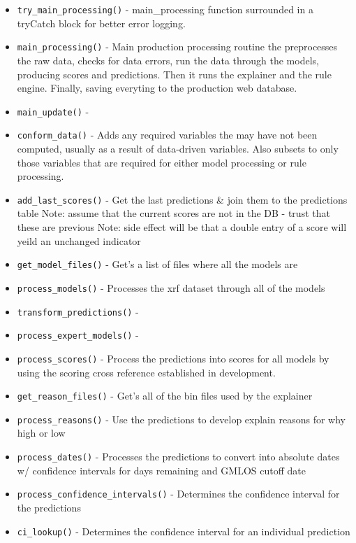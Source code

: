 \documentclass[
]{book}
\providecommand{\tightlist}{%
  \setlength{\itemsep}{0pt}\setlength{\parskip}{0pt}}
\begin{document}
\begin{itemize}
\tightlist
\item
  \texttt{try\_main\_processing()} - main\_processing function surrounded in a tryCatch block for better error logging.
\item
  \texttt{main\_processing()} - Main production processing routine the preprocesses the raw data, checks for data errors, run the data through the models, producing scores and predictions. Then it runs the explainer and the rule engine. Finally, saving everyting to the production web database.
\item
  \texttt{main\_update()} -
\item
  \texttt{conform\_data()} - Adds any required variables the may have not been computed, usually as a result of data-driven variables. Also subsets to only those variables that are required for either model processing or rule processing.
\item
  \texttt{add\_last\_scores()} - Get the last predictions \& join them to the predictions table Note: assume that the current scores are not in the DB - trust that these are previous Note: side effect will be that a double entry of a score will yeild an unchanged indicator
\item
  \texttt{get\_model\_files()} - Get's a list of files where all the models are
\item
  \texttt{process\_models()} - Processes the xrf dataset through all of the models
\item
  \texttt{transform\_predictions()} -
\item
  \texttt{process\_expert\_models()} -
\item
  \texttt{process\_scores()} - Process the predictions into scores for all models by using the scoring cross reference established in development.
\item
  \texttt{get\_reason\_files()} - Get's all of the bin files used by the explainer
\item
  \texttt{process\_reasons()} - Use the predictions to develop explain reasons for why high or low
\item
  \texttt{process\_dates()} - Processes the predictions to convert into absolute dates w/ confidence intervals for days remaining and GMLOS cutoff date
\item
  \texttt{process\_confidence\_intervals()} - Determines the confidence interval for the predictions
\item
  \texttt{ci\_lookup()} - Determines the confidence interval for an individual prediction

\end{itemize}
\end{document}
